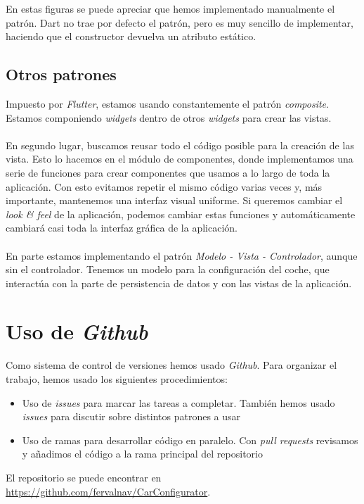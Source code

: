 En estas figuras se puede apreciar que hemos implementado manualmente el patrón. Dart no trae por defecto el patrón, pero es muy sencillo de implementar, haciendo que el constructor devuelva un atributo estático.

\newpage

\subsection{Otros patrones}

Impuesto por \emph{Flutter}, estamos usando constantemente el patrón \emph{composite}. Estamos componiendo \emph{widgets} dentro de otros \emph{widgets} para crear las vistas.
\\\\
En segundo lugar, buscamos reusar todo el código posible para la creación de las vista. Esto lo hacemos en el módulo de componentes, donde implementamos una serie de funciones para crear componentes que usamos a lo largo de toda la aplicación. Con esto evitamos repetir el mismo código varias veces y, más importante, mantenemos una interfaz visual uniforme. Si queremos cambiar el \emph{look \& feel} de la aplicación, podemos cambiar estas funciones y automáticamente cambiará casi toda la interfaz gráfica de la aplicación.
\\\\
En parte estamos implementando el patrón \emph{Modelo - Vista - Controlador}, aunque sin el controlador. Tenemos un modelo para la configuración del coche, que interactúa con la parte de persistencia de datos y con las vistas de la aplicación.

\newpage

\section{Uso de \emph{Github}}

Como sistema de control de versiones hemos usado \emph{Github}. Para organizar el trabajo, hemos usado los siguientes procedimientos:

\begin{itemize}
    \item Uso de \emph{issues} para marcar las tareas a completar. También hemos usado \emph{issues} para discutir sobre distintos patrones a usar
    \item Uso de ramas para desarrollar código en paralelo. Con \emph{pull requests} revisamos y añadimos el código a la rama principal del repositorio
\end{itemize}

El repositorio se puede encontrar en \href{https://github.com/fervalnav/CarConfigurator}{https://github.com/fervalnav/CarConfigurator}.


